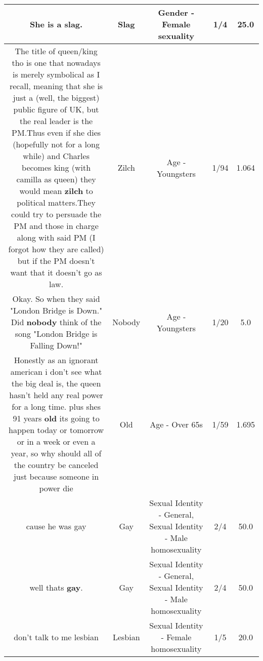 \documentclass[11pt]{article}
\newlength\mylength
\begin{document}
\begin{center}
\begin{longtable}{|C{.65\mylength}|C{.30\mylength}|C{.12\mylength}|C{.12\mylength}|C{.12\mylength}|}
  \small She is a \textbf{slag}.\normalsize   & Slag & Gender - Female sexuality & 1/4 & 25.0 \\  \hline
  \small The title of queen/king tho is one that nowadays is merely symbolical as I recall, meaning that she is just a (well, the biggest) public figure of UK, but the real leader is the PM.Thus even if she dies (hopefully not for a long while) and Charles becomes king (with camilla as queen) they would mean \textbf{zilch} to political matters.They could try to persuade the PM and those in charge along with said PM (I forgot how they are called) but if the PM doesn't want that it doesn't go as law.\normalsize   & Zilch & Age - Youngsters & 1/94 & 1.064 \\  \hline
  \small Okay. So when they said "London Bridge is Down." Did \textbf{nobody} think of the song "London Bridge is Falling Down!"\normalsize   & Nobody & Age - Youngsters & 1/20 & 5.0 \\  \hline
  \small Honestly as an ignorant american i don't see what the big deal is, the queen hasn't held any real power for a long time. plus shes 91 years \textbf{old} its going to happen today or tomorrow or in a week or even a year, so why should all of the country be canceled just because someone in power die\normalsize   & Old & Age - Over 65s & 1/59 & 1.695 \\  \hline
  \small cause he was gay\normalsize   & Gay & Sexual Identity - General, Sexual Identity - Male homosexuality & 2/4 & 50.0 \\  \hline
  \small {} well thats \textbf{g\textbf{ay}}.\normalsize   & Gay & Sexual Identity - General, Sexual Identity - Male homosexuality & 2/4 & 50.0 \\  \hline
  \small don't talk to me lesbian\normalsize   & Lesbian & Sexual Identity - Female homosexuality & 1/5 & 20.0 \\  \hline

\end{longtable}
\end{center}
\end{document}
